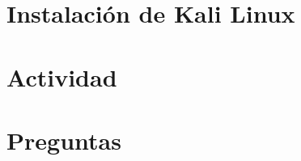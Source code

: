 \documentclass[12pt]{article} %
\begin{document}
\hypersetup{pageanchor=false}

\hypersetup{pageanchor=true}

\section*{Instalación de Kali Linux}




\section*{Actividad}

\begin{enumerateColor}
    \item \leavevmode
    \item \leavevmode
    \item \leavevmode
    \item \leavevmode
    \item \leavevmode
    \item \leavevmode
    \item \leavevmode
\end{enumerateColor}

\section*{Preguntas}

\begin{enumerateColor}[start=8]
    \item \leavevmode
    \item \leavevmode
    \item \leavevmode
    \item \leavevmode
    \item \leavevmode
    \item \leavevmode
    \item \leavevmode
\end{enumerateColor}


\nocite{*}

\end{document}
